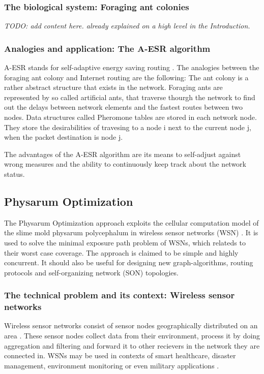 \documentclass{IWORK2014}
\begin{document}
\subsubsection{The biological system: Foraging ant colonies}
\textit{TODO: add content here. already explained on a high level in the Introduction.}

\subsubsection{Analogies and application: The A-ESR algorithm}
A-ESR stands for self-adaptive energy saving routing \cite{kim2012ant}. The analogies between the foraging ant colony and Internet routing are the following: The ant colony is a rather abstract structure that exists in the network. Foraging ants are represented by so called artificial ants, that traverse thourgh the network to find out the delays between network elements and the fastest routes between two nodes. Data structures called Pheromone tables are stored in each network node. They store the desirabilities of travesing to a node i next to the current node j, when the packet destination is node j.

The advantages of the A-ESR algorithm are its means to self-adjust against wrong measures and the ability to continuously keep track about the network status.

\subsection{Physarum Optimization}
The Physarum Optimization approach exploits the cellular computation model of the slime mold physarum polycephalum in wireless sensor networks (WSN) \cite{liu2012physarum}. It is used to solve the minimal exposure path problem of WSNs, which relateds to their worst case coverage. The approach is claimed to be simple and highly concurrent. It should also be useful for designing new graph-algorithms, routing protocols and self-organizing network (SON) topologies.

\subsubsection{The technical problem and its context: Wireless sensor networks}
Wireless sensor networks consist of sensor nodes geographically distributed on an area \cite{nazi2013robust}. These sensor nodes collect data from their environment, process it by doing aggregation and filtering and forward it to other recievers in the network they are connected in. WSNs may be used in contexts of smart healthcare, disaster management, environment monitoring \cite{nazi2013robust} or even military applications \cite{liu2012physarum}.
\end{document}
